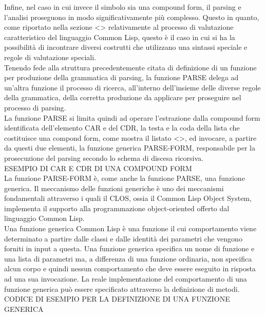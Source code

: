 Infine, nel caso in cui invece il simbolo sia una compound form, il parsing e
l’analisi proseguono in modo significativamente più complesso. Questo in
quanto, come riportato nella sezione <> relativamente al processo di
valutazione caratteristico del linguaggio Common Lisp, questo è il caso in cui
si ha la possibilità di incontrare diversi costrutti che utilizzano una
sintassi speciale e regole di valutazione speciali.\\

Tenendo fede alla struttura precedentemente citata di definizione di un
funzione per produzione della grammatica di parsing, la funzione PARSE delega
ad un’altra funzione il processo di ricerca, all’interno dell’insieme delle
diverse regole della grammatica, della corretta produzione da applicare per
proseguire nel processo di parsing.\\

La funzione PARSE si limita quindi ad operare l'estrazione dalla compound form
identificata dell’elemento CAR e del CDR, la testa e la coda della lista che
costituisce una compond form, come mostra il listato <>, ed invocare, a
partire da questi due elementi, la funzione generica PARSE-FORM, responsabile
per la prosecuzione del parsing secondo lo schema di discesa ricorsiva.\\

ESEMPIO DI CAR E CDR DI UNA COMPOUND FORM\\

La funzione PARSE-FORM è, come anche la funzione PARSE, una funzione generica.
Il meccanismo delle funzioni generiche è uno dei meccanismi fondamentali
attraverso i quali il CLOS, ossia il Common Lisp Object System, implementa il
supporto alla programmazione object-oriented offerto dal linguaggio Common
Lisp.\\

Una funzione generica Common Lisp è una funzione il cui comportamento viene
determinato a partire dalle classi e dalle identità dei parametri che vengono
forniti in input a questa. Una funzione generica specifica un nome di funzione
e una lista di parametri ma, a differenza di una funzione ordinaria, non
specifica alcun corpo e quindi nessun comportamento che deve essere eseguito
in risposta ad una sua invocazione. La reale implementazione del comportamento
di una funzione generica può essere specificato attraverso la definizione di
metodi.\\

CODICE DI ESEMPIO PER LA DEFINIZIONE DI UNA FUNZIONE GENERICA\\

